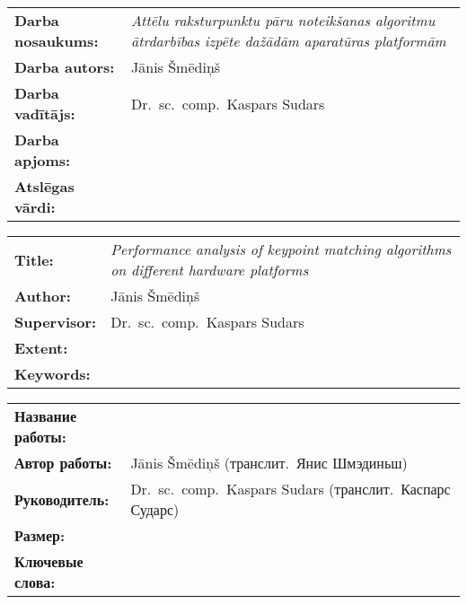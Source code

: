 
\abstitlestyle{\abstractname} %
\noindent%
\begin{tabularx}{\textwidth}{lX}
	\textbf{Darba nosaukums:} & 
		\textit{Attēlu raksturpunktu pāru noteikšanas algoritmu
		        ātrdarbības izpēte dažādām aparatūras platformām}\\[1ex]
	\textbf{Darba autors:} & Jānis Šmēdiņš\\[1ex]
	\textbf{Darba vadītājs:} & Dr.~sc.~comp.~Kaspars Sudars\\[1ex]
	\textbf{Darba apjoms:} & \TODO \\[1ex]
	\textbf{Atslēgas vārdi:} & \TODO
\end{tabularx}

\vspace{1em}
\TODO

\clearpage
\begin{english} %
	\abstitlestyle{\abstractname} %
	\noindent%
	\begin{tabularx}{\textwidth}{lX}
		\textbf{Title:} & 
			\textit{Performance analysis of keypoint matching algorithms on
			        different hardware platforms}\\[1ex]
		\textbf{Author:} & Jānis Šmēdiņš\\[1ex]
		\textbf{Supervisor:} & Dr.~sc.~comp.~Kaspars Sudars\\[1ex]
		\textbf{Extent:} & \TODO \\[1ex]
		\textbf{Keywords:} & \TODO
	\end{tabularx}
	
	\vspace{1em}
	\TODO
\end{english}

\clearpage
\begin{russian} %
	\abstitlestyle{\abstractname} %
	\noindent%
	\begin{tabularx}{\textwidth}{lX}
		\textbf{Название работы:} & 
			\textit{\TODO}\\[1ex]
		\textbf{Автор работы:} & Jānis Šmēdiņš (транслит.~Янис Шмэдиньш)\\[1ex]
		\textbf{Руководитель:} & Dr.~sc.~comp.~Kaspars Sudars 
			(транслит.~Каспарс Сударс)\\[1ex]
		\textbf{Размер:} & \TODO \\[1ex]
		\textbf{Ключевые слова:} & \TODO
	\end{tabularx}
	
	\vspace{1em}
	\TODO
	
\end{russian}
